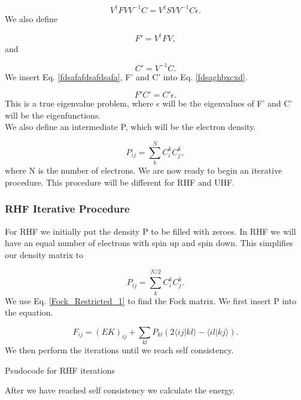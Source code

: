 \begin{equation}
V^{\dag} F V V^{-1} C = V^{\dag} S V V^{-1} C \epsilon .
\end{equation}
We also define 

\begin{equation}
F' = V^{\dag} F V ,
\end{equation}
and

\begin{equation}
C' = V^{-1} C .
\end{equation} 
We insert Eq. \eqref{fdsafafdsafdsafa}, F' and C' into Eq. \eqref{fdsaghbxcxd}.

\begin{equation}
F' C' = C' \epsilon .
\end{equation}
This is a true eigenvalue problem, where $\epsilon$ will be the eigenvalues of F' and C' will be the eigenfunctions. \\

We also define an intermediate P, which will be the electron density. 

\begin{equation}
P_{ij} = \sum_k^N C_i^k C_j^k ,
\end{equation}
where N is the number of electrons. We are now ready to begin an iterative procedure. This procedure will be different for RHF and UHF. 

\subsubsection{RHF Iterative Procedure}
For RHF we initially put the density P to be filled with zeroes. In RHF we will have an equal number of electrons with spin up and spin down. This simplifies our density matrix to

\begin{equation}
P_{ij} = \sum_k^{N/2} C_i^k C_j^k .
\end{equation}
We use Eq. \eqref{Fock_Restricted_1} to find the Fock matrix. We first insert P into the equation.

\begin{equation}
F_{ij} = (EK)_{ij} + \sum_{kl} P_{kl} (2 \langle i j | k l \rangle - \langle i l | k j \rangle) .
\end{equation}
We then perform the iterations until we reach self consistency. \\

\begin{algorithm}[H]
 \caption{Psudocode for RHF iterations}
 \label{RHF_ITERATIVE_PROCEDURE}
\end{algorithm}
After we have reached self consistency we calculate the energy.

